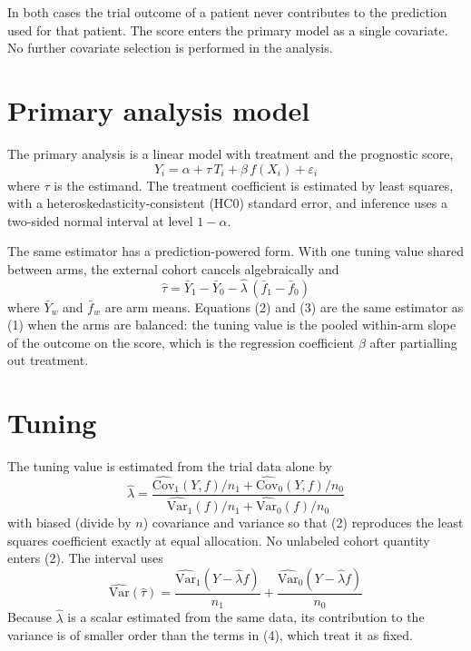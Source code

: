\documentclass[11pt]{article}
\begin{document}
In both cases the trial outcome of a patient never contributes to the prediction
used for that patient. The score enters the primary model as a single covariate.
No further covariate selection is performed in the analysis.

\section{Primary analysis model}

The primary analysis is a linear model with treatment and the prognostic score,
\begin{equation}Y_{i} = \alpha + \tau\, T_{i} + \beta\, f(X_{i}) + \varepsilon_{i}\end{equation}
where $\tau$ is the estimand. The treatment coefficient is estimated by least
squares, with a heteroskedasticity-consistent (HC0) standard error, and inference
uses a two-sided normal interval at level $1-\alpha$.

The same estimator has a prediction-powered form. With one tuning value shared
between arms, the external cohort cancels algebraically and
\begin{equation}\hat{\tau} = \bar{Y}_{1} - \bar{Y}_{0} - \hat{\lambda}\,\left(\bar{f}_{1} - \bar{f}_{0}\right)\end{equation}
where $\bar{Y}_{w}$ and $\bar{f}_{w}$ are arm means. Equations
(2) and (3) are the same estimator as (1) when the arms are balanced: the tuning
value is the pooled within-arm slope of the outcome on the score, which is the
regression coefficient $\beta$ after partialling out treatment.

\section{Tuning}

The tuning value is estimated from the trial data alone by
\begin{equation}\hat{\lambda} = \frac{\widehat{\mathrm{Cov}}_{1}(Y,f)/n_{1} + \widehat{\mathrm{Cov}}_{0}(Y,f)/n_{0}}{\widehat{\mathrm{Var}}_{1}(f)/n_{1} + \widehat{\mathrm{Var}}_{0}(f)/n_{0}}\end{equation}
with biased (divide by $n$) covariance and variance so that (2) reproduces the
least squares coefficient exactly at equal allocation. No unlabeled cohort
quantity enters (2). The interval uses
\begin{equation}\widehat{\mathrm{Var}}(\hat{\tau}) = \frac{\widehat{\mathrm{Var}}_{1}(Y - \hat{\lambda} f)}{n_{1}} + \frac{\widehat{\mathrm{Var}}_{0}(Y - \hat{\lambda} f)}{n_{0}}\end{equation}
Because $\hat{\lambda}$ is a scalar estimated from the same data, its
contribution to the variance is of smaller order than the terms in (4), which
treat it as fixed.
\end{document}
